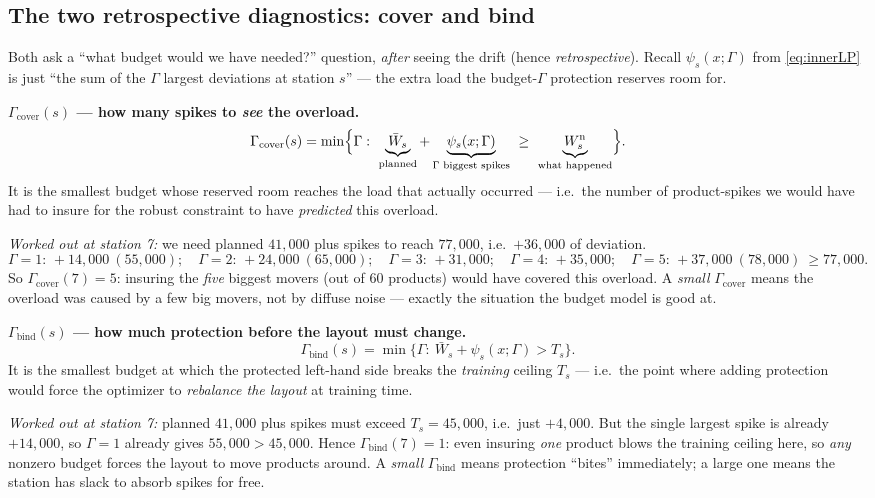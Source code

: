 \documentclass[11pt]{article}
\theoremstyle{definition}
\theoremstyle{plain}
\theoremstyle{remark}
\begin{document}
\subsection{The two retrospective diagnostics: cover and bind}

Both ask a ``what budget would we have needed?'' question, \emph{after} seeing the
drift (hence \emph{retrospective}). Recall $\psi_s(x;\Gamma)$ from
\eqref{eq:innerLP} is just ``the sum of the $\Gamma$ largest deviations at station
$s$'' --- the extra load the budget-$\Gamma$ protection reserves room for.

\medskip
\noindent\textbf{$\Gamma_{\mathrm{cover}}(s)$ --- how many spikes to \emph{see} the overload.}
\begin{equation}
\Gamma_{\mathrm{cover}}(s) = \min\Bigl\{\Gamma :\ \underbrace{\bar W_s}_{\text{planned}} + \underbrace{\psi_s(x;\Gamma)}_{\text{$\Gamma$ biggest spikes}} \ \ge\ \underbrace{W^{\mathrm n}_s}_{\text{what happened}}\Bigr\}.
\end{equation}
It is the smallest budget whose reserved room reaches the load that actually
occurred --- i.e.\ the number of product-spikes we would have had to insure for
the robust constraint to have \emph{predicted} this overload.

\emph{Worked out at station 7:} we need planned $41{,}000$ plus spikes to reach
$77{,}000$, i.e.\ $+36{,}000$ of deviation.
\[
\Gamma{=}1:\,+14{,}000\ (55{,}000);\quad
\Gamma{=}2:\,+24{,}000\ (65{,}000);\quad
\Gamma{=}3:\,+31{,}000;\quad
\Gamma{=}4:\,+35{,}000;\quad
\Gamma{=}5:\,+37{,}000\ (78{,}000)\ \ge 77{,}000.
\]
So $\Gamma_{\mathrm{cover}}(7)=5$: insuring the \emph{five} biggest movers (out
of $60$ products) would have covered this overload. A \emph{small}
$\Gamma_{\mathrm{cover}}$ means the overload was caused by a few big movers, not
by diffuse noise --- exactly the situation the budget model is good at.

\medskip
\noindent\textbf{$\Gamma_{\mathrm{bind}}(s)$ --- how much protection before the layout must change.}
\begin{equation}
\Gamma_{\mathrm{bind}}(s) = \min\{\Gamma :\ \bar W_s + \psi_s(x;\Gamma) > T_s\}.
\end{equation}
It is the smallest budget at which the protected left-hand side breaks the
\emph{training} ceiling $T_s$ --- i.e.\ the point where adding protection would
force the optimizer to \emph{rebalance the layout} at training time.

\emph{Worked out at station 7:} planned $41{,}000$ plus spikes must exceed
$T_s=45{,}000$, i.e.\ just $+4{,}000$. But the single largest spike is already
$+14{,}000$, so $\Gamma{=}1$ already gives $55{,}000 > 45{,}000$. Hence
$\Gamma_{\mathrm{bind}}(7)=1$: even insuring \emph{one} product blows the training
ceiling here, so \emph{any} nonzero budget forces the layout to move products
around. A \emph{small} $\Gamma_{\mathrm{bind}}$ means protection ``bites''
immediately; a large one means the station has slack to absorb spikes for free.
\end{document}
